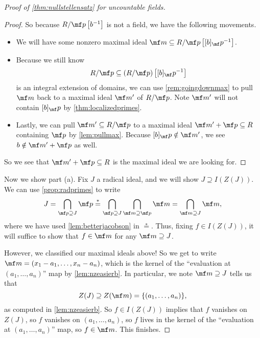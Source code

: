 \begin{proof}[Proof of \autoref{thm:nullstellensatz} for uncountable fields]
\begin{proof}
		So because $R/\mf p\left[b^{-1}\right]$ is not a field, we have the following movements.
		\begin{itemize}
			\item We will have some nonzero maximal ideal $\mf m\subseteq R/\mf p\left[[b]_\mf p^{-1}\right]$.
			\item Because we still know
			\[R/\mf p\subseteq(R/\mf p)\left[[b]_\mf p^{-1}\right]\]
			is an integral extension of domains, we can use \autoref{rem:goingdownmax} to pull $\mf m$ back to a maximal ideal $\mf m'$ of $R/\mf p$. Note $\mf m'$ will not contain $[b]_\mf p$ by \autoref{thm:localizedprimes}.
			\item Lastly, we can pull $\mf m'\subseteq R/\mf p$ to a maximal ideal $\mf m'+\mf p\subseteq R$ containing $\mf p$ by \autoref{lem:pullmax}. Because $[b]_\mf p\notin\mf m'$, we see $b\notin\mf m'+\mf p$ as well.
		\end{itemize}
		So we see that $\mf m'+\mf p\subseteq R$ is the maximal ideal we are looking for.
	\end{proof}
	Now we show part (a). Fix $J$ a radical ideal, and we will show $J\supseteq I(Z(J))$. We can use \autoref{prop:radprimes} to write
	\[J=\bigcap_{\mf p\supseteq J}\mf p\stackrel*=\bigcap_{\mf p\supseteq J}\bigcap_{\mf m\supseteq\mf p}\mf m=\bigcap_{\mf m\supseteq J}\mf m,\]
	where we have used \autoref{lem:betterjacobson} in $\stackrel*=$. Thus, fixing $f\in I(Z(J))$, it will suffice to show that $f\in\mf m$ for any $\mf m\supseteq J$.
	
	However, we classified our maximal ideals above! So we get to write $\mf m=(x_1-a_1,\ldots,x_n-a_n)$, which is the kernel of the ``evaluation at $(a_1,\ldots,a_n)$'' map by \autoref{lem:nzeasierb}. In particular, we note $\mf m\supseteq J$ tells us that
	\[Z(J)\supseteq Z(\mf m)=\{(a_1,\ldots,a_n)\},\]
	as computed in \autoref{lem:nzeasierb}. So $f\in I(Z(J))$ implies that $f$ vanishes on $Z(J)$, so $f$ vanishes on $(a_1,\ldots,a_n)$, so $f$ lives in the kernel of the ``evaluation at $(a_1,\ldots,a_n)$'' map, so $f\in\mf m$. This finishes.
\end{proof}

